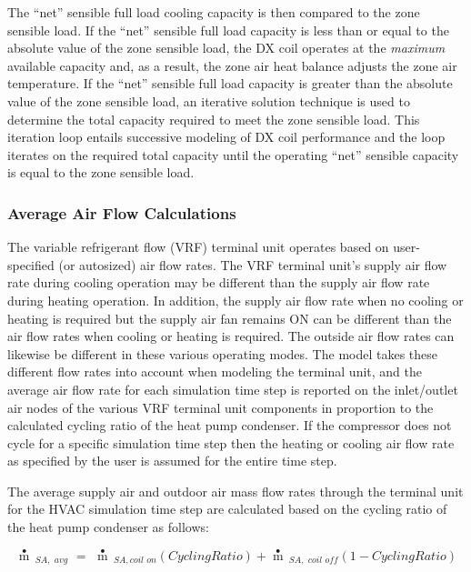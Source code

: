 The ``net'' sensible full load cooling capacity is then compared to the zone sensible load. If the ``net'' sensible full load capacity is less than or equal to the absolute value of the zone sensible load, the DX coil operates at the \emph{maximum} available capacity and, as a result, the zone air heat balance adjusts the zone air temperature. If the ``net'' sensible full load capacity is greater than the absolute value of the zone sensible load, an iterative solution technique is used to determine the total capacity required to meet the zone sensible load. This iteration loop entails successive modeling of DX coil performance and the loop iterates on the required total capacity until the operating ``net'' sensible capacity is equal to the zone sensible load.

\subsubsection{Average Air Flow Calculations}\label{average-air-flow-calculations-2}

The variable refrigerant flow (VRF) terminal unit operates based on user-specified (or autosized) air flow rates. The VRF terminal unit's supply air flow rate during cooling operation may be different than the supply air flow rate during heating operation. In addition, the supply air flow rate when no cooling or heating is required but the supply air fan remains ON can be different than the air flow rates when cooling or heating is required. The outside air flow rates can likewise be different in these various operating modes. The model takes these different flow rates into account when modeling the terminal unit, and the average air flow rate for each simulation time step is reported on the inlet/outlet air nodes of the various VRF terminal unit components in proportion to the calculated cycling ratio of the heat pump condenser. If the compressor does not cycle for a specific simulation time step then the heating or cooling air flow rate as specified by the user is assumed for the entire time step.

The average supply air and outdoor air mass flow rates through the terminal unit for the HVAC simulation time step are calculated based on the cycling ratio of the heat pump condenser as follows:

\begin{equation}
\mathop m\limits^ \bullet  {\,_{SA,\,\,avg}}\,\, = \,\,\mathop m\limits^ \bullet  {\,_{SA,coil\,\,on}}\left( {CyclingRatio} \right) + \mathop m\limits^ \bullet  {\,_{SA,\,\,coil\,\,off}}\left( {1 - CyclingRatio} \right)
\end{equation}

